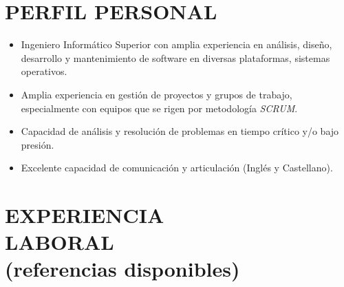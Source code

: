 \documentclass[line,margin]{res}
\begin{document}
\address{+34 678714822 / roberlamerma@gmail.com}

\begin{resume}
 
\section{PERFIL PERSONAL}       
                \begin{itemize}  \itemsep 2pt %
                \item  Ingeniero Inform\'{a}tico Superior con amplia 
                experiencia en an\'{a}lisis, dise\~{n}o, desarrollo y 
                mantenimiento de software en diversas plataformas, sistemas 
                operativos.
                \item Amplia experiencia en gesti\'{o}n de proyectos y grupos de 
                trabajo, especialmente con equipos que se rigen por metodolog\'{i}a \textit{SCRUM}.
                \item Capacidad de an\'{a}lisis y resoluci\'{o}n de problemas en 
                tiempo cr\'{i}tico y/o bajo presi\'{o}n.
                \item Excelente capacidad de comunicaci\'{o}n y articulaci\'{o}n 
                (Ingl\'{e}s y Castellano).
                \end{itemize}
         

\section{EXPERIENCIA \\LABORAL \\ \footnotesize{(referencias disponibles)}}


\end{resume}
\end{document}
